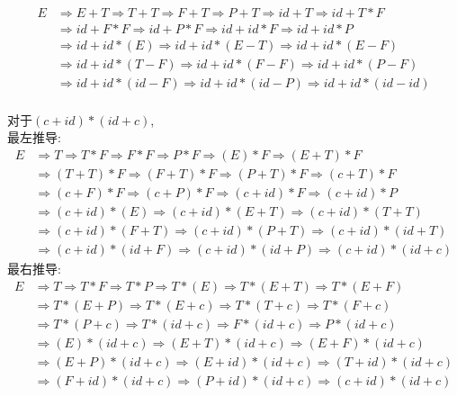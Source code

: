 \documentclass{article}
\begin{document}
\begin{align*}
    E & \Rightarrow E + T \Rightarrow T + T \Rightarrow F + T \Rightarrow P + T \Rightarrow id + T \Rightarrow id + T * F\\
      & \Rightarrow id + F * F \Rightarrow id + P * F \Rightarrow id + id * F \Rightarrow id + id * P \\
      & \Rightarrow id + id * (E) \Rightarrow id + id * (E - T) \Rightarrow id + id * (E - F)  \\
      & \Rightarrow id + id * (T - F) \Rightarrow id + id * (F - F) \Rightarrow id + id * (P - F)  \\
      & \Rightarrow id + id * (id - F) \Rightarrow id + id * (id - P) \Rightarrow id + id * (id - id)
\end{align*}
\\
对于$(c + id) * (id + c)$, \\
最左推导:
\begin{align*}
    E & \Rightarrow T \Rightarrow T * F \Rightarrow F * F \Rightarrow P * F \Rightarrow (E) * F \Rightarrow (E + T) * F\\
      & \Rightarrow (T + T) * F \Rightarrow (F + T) * F \Rightarrow (P + T) * F \Rightarrow (c + T) * F\\
      & \Rightarrow (c + F) * F \Rightarrow (c + P) * F \Rightarrow (c + id) * F \Rightarrow (c + id) * P\\
      & \Rightarrow (c + id) * (E) \Rightarrow (c + id) * (E + T) \Rightarrow (c + id) * (T + T)\\
      & \Rightarrow (c + id) * (F + T) \Rightarrow (c + id) * (P + T) \Rightarrow (c + id) * (id + T)\\
      & \Rightarrow (c + id) * (id + F) \Rightarrow (c + id) * (id + P) \Rightarrow (c + id) * (id + c)   
\end{align*}
最右推导:
\begin{align*}
    E & \Rightarrow T \Rightarrow T * F \Rightarrow T * P \Rightarrow T * (E) \Rightarrow T * (E + T) \Rightarrow T * (E + F)\\
      & \Rightarrow T * (E + P) \Rightarrow T * (E + c) \Rightarrow T * (T + c) \Rightarrow T * (F + c) \\
      & \Rightarrow T * (P + c) \Rightarrow T * (id + c) \Rightarrow F * (id + c) \Rightarrow P * (id + c) \\
      & \Rightarrow (E) * (id + c) \Rightarrow (E + T) * (id + c) \Rightarrow (E + F) * (id + c) \\
      & \Rightarrow (E + P) * (id + c) \Rightarrow (E + id) * (id + c) \Rightarrow (T + id) * (id + c) \\
      & \Rightarrow (F + id) * (id + c) \Rightarrow (P + id) * (id + c) \Rightarrow (c + id) * (id + c)
\end{align*}
\end{document}
